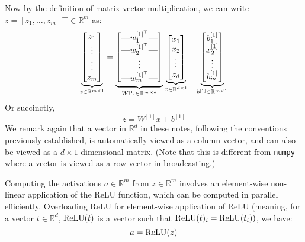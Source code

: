 Now by the definition of matrix vector multiplication, we can write $z =
[z_1 ,\ldots,z_m ] \top \in \mathbb{R}^m$ as:
\begin{equation*}\label{eq:vectorized}
    \underbrace{\begin{bmatrix}
        z_1\\
        \vdots\\
        \vdots\\
        z_m
    \end{bmatrix}}_{z \in \mathbb R^{m \times 1}} = 
    \underbrace{\begin{bmatrix}
        \horzbar w^{[1]^\top}_1 \horzbar\\
        \horzbar w^{[1]^\top}_2 \horzbar\\
        \vdots\\
        \horzbar w^{[1]^\top}_m \horzbar
    \end{bmatrix}}_{W^{[1]} \in \mathbb{R}^{m \times d}}
    \underbrace{\begin{bmatrix}
        x_1\\
        x_2\\
        \vdots\\
        z_d
    \end{bmatrix}}_{x \in \mathbb R^{d \times 1}} + 
    \underbrace{\begin{bmatrix}
        b_1^{[1]}\\
        x_2^{[1]}\\
        \vdots\\
        b_m^{[1]}
    \end{bmatrix}}_{b^{[1]} \in \mathbb R^{m \times 1}}
\end{equation*}
Or succinctly,
\begin{equation}
    z = W^{[1]} x + b^{[1]}
\end{equation}
We remark again that a vector in $\mathbb R^d$ in these notes, following the conventions %
previously established, is automatically viewed as a column vector, and can
also be viewed as a $d \times 1$ dimensional matrix. (Note that this is different
from \texttt{numpy} where a vector is viewed as a row vector in broadcasting.)

Computing the activations $a \in \mathbb{R}^m$ from $z \in \mathbb{R}^m$ involves an element-wise
non-linear application of the ReLU function, which can be computed in
parallel efficiently. Overloading ReLU for element-wise application of ReLU
(meaning, for a vector $t \in \mathbb{R}^d$, $\operatorname{ReLU}(t)$ is a vector such that $\operatorname{ReLU}(t)_i =
\operatorname{ReLU}(t_i))$, we have:
\begin{equation}
    a = \operatorname{ReLU}(z)
\end{equation}

